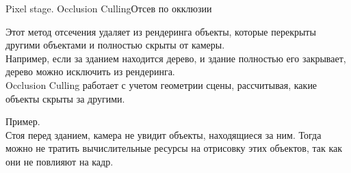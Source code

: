 \documentclass{beamer}
\begin{document}
	\begin{frame}{Pixel stage. Occlusion Culling}{Отсев по окклюзии}

Этот метод отсечения удаляет из рендеринга объекты, которые перекрыты другими объектами и полностью скрыты от камеры. 
\\
Например, если за зданием находится дерево, и здание полностью его закрывает, дерево можно исключить из рендеринга. 
\\
Occlusion Culling работает с учетом геометрии сцены, рассчитывая, какие объекты скрыты за другими.

Пример. \\
Стоя перед зданием, камера не увидит объекты, находящиеся за ним. Тогда можно не тратить вычислительные ресурсы на отрисовку этих объектов, так как они не повлияют на кадр.


	\end{frame}
\end{document}
